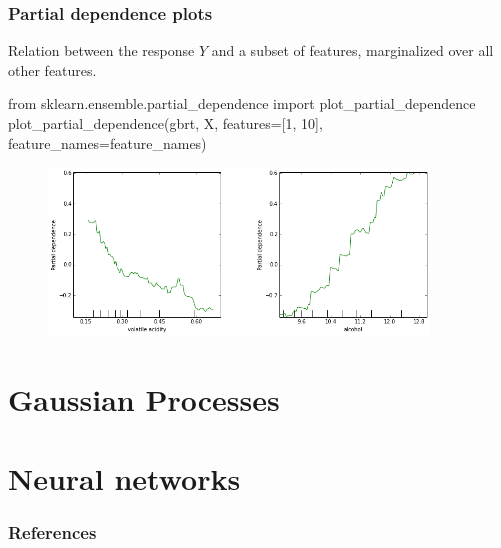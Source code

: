 \documentclass{beamer}
\begin{document}
\begin{frame}[fragile]
  \frametitle{Partial dependence plots}

Relation between the response $Y$ and a subset of features, marginalized over all other features.

\vspace{0.25cm}

{\scriptsize
\begin{pythoncode}
from sklearn.ensemble.partial_dependence import plot_partial_dependence
plot_partial_dependence(gbrt, X,
                        features=[1, 10], feature_names=feature_names)
\end{pythoncode}
}

    \begin{figure}
       \centering
       \includegraphics[width=0.9\textwidth]{./figures/dependence.png}
    \end{figure}
\end{frame}




\section{Gaussian Processes}




\section{Neural networks}







\begin{frame}
    \frametitle{References}
    {\footnotesize
    
    }
\end{frame}
\end{document}
